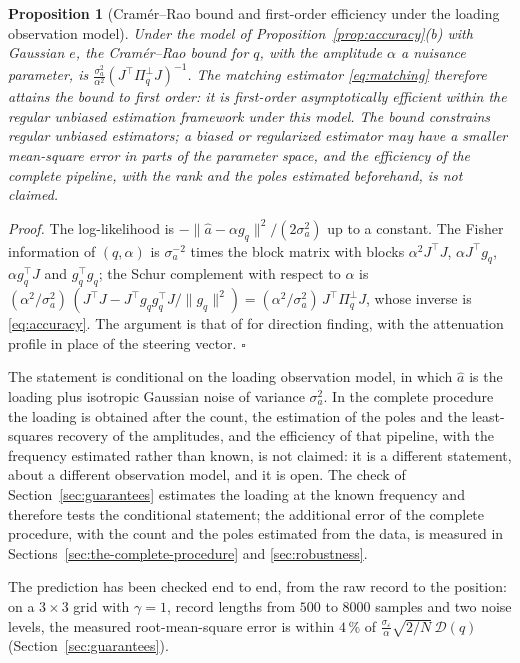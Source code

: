 \documentclass{article}
\newtheorem{proposition}{\bf Proposition}
\begin{document}
\begin{proposition}[Cram\'er--Rao bound and first-order efficiency under the loading observation model] \label{prop:crb}
Under the model of Proposition~\ref{prop:accuracy}(b) with Gaussian $e$, the Cram\'er--Rao bound for $q$, with the amplitude $\alpha$ a nuisance parameter, is $\frac{\sigma_a^{2}}{\alpha^{2}} (J^{\top} \Pi_q^{\perp} J)^{-1}$. The matching estimator \eqref{eq:matching} therefore attains the bound to first order: it is first-order asymptotically efficient within the regular unbiased estimation framework under this model. The bound constrains regular unbiased estimators; a biased or regularized estimator may have a smaller mean-square error in parts of the parameter space, and the efficiency of the complete pipeline, with the rank and the poles estimated beforehand, is not claimed.
\end{proposition}

\textit{Proof.} The log-likelihood is $-\lVert \widehat{a} - \alpha g_q \rVert^{2}/(2\sigma_a^{2})$ up to a constant. The Fisher information of $(q, \alpha)$ is $\sigma_a^{-2}$ times the block matrix with blocks $\alpha^{2} J^{\top} J$, $\alpha J^{\top} g_q$, $\alpha g_q^{\top} J$ and $g_q^{\top} g_q$; the Schur complement with respect to $\alpha$ is $(\alpha^{2}/\sigma_a^{2})\,(J^{\top} J - J^{\top} g_q g_q^{\top} J / \lVert g_q \rVert^{2}) = (\alpha^{2}/\sigma_a^{2})\, J^{\top} \Pi_q^{\perp} J$, whose inverse is \eqref{eq:accuracy}. The argument is that of \cite{ref-StoicaNehorai} for direction finding, with the attenuation profile in place of the steering vector. $\square$

The statement is conditional on the loading observation model, in which $\widehat{a}$ is the loading plus isotropic Gaussian noise of variance $\sigma_a^{2}$. In the complete procedure the loading is obtained after the count, the estimation of the poles and the least-squares recovery of the amplitudes, and the efficiency of that pipeline, with the frequency estimated rather than known, is not claimed: it is a different statement, about a different observation model, and it is open. The check of Section~\ref{sec:guarantees} estimates the loading at the known frequency and therefore tests the conditional statement; the additional error of the complete procedure, with the count and the poles estimated from the data, is measured in Sections~\ref{sec:the-complete-procedure} and \ref{sec:robustness}.

The prediction has been checked end to end, from the raw record to the position: on a $3 \times 3$ grid with $\gamma = 1$, record lengths from $500$ to $8000$ samples and two noise levels, the measured root-mean-square error is within $4\,\%$ of $\frac{\sigma_\varepsilon}{\alpha}\sqrt{2/N}\,\mathcal{D}(q)$ (Section~\ref{sec:guarantees}).
\end{document}
